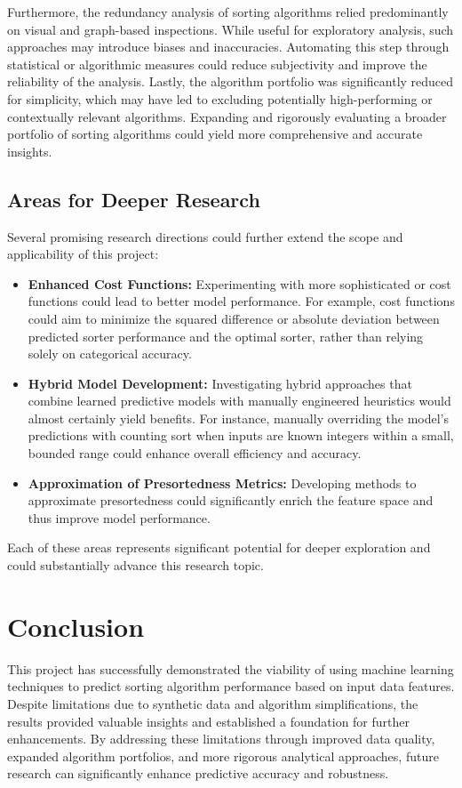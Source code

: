 \documentclass[twocolumn]{article}
\newcommand{\vsp}{\vspace{0.5em}}
\begin{document}
Furthermore, the redundancy analysis of sorting algorithms relied predominantly on visual and graph-based inspections. While useful for exploratory analysis, such approaches may introduce biases and inaccuracies. Automating this step through statistical or algorithmic measures could reduce subjectivity and improve the reliability of the analysis. Lastly, the algorithm portfolio was significantly reduced for simplicity, which may have led to excluding potentially high-performing or contextually relevant algorithms. Expanding and rigorously evaluating a broader portfolio of sorting algorithms could yield more comprehensive and accurate insights.

\subsection{Areas for Deeper Research}
Several promising research directions could further extend the scope and applicability of this project:

\begin{itemize}
    \item \textbf{Enhanced Cost Functions:} Experimenting with more sophisticated or cost functions could lead to better model performance. For example, cost functions could aim to minimize the squared difference or absolute deviation between predicted sorter performance and the optimal sorter, rather than relying solely on categorical accuracy. 

    \item \textbf{Hybrid Model Development:} Investigating hybrid approaches that combine learned predictive models with manually engineered heuristics would almost certainly yield benefits. For instance, manually overriding the model's predictions with counting sort when inputs are known integers within a small, bounded range could enhance overall efficiency and accuracy.

    \vsp 
    \vsp

    \item \textbf{Approximation of Presortedness Metrics:} Developing methods to approximate presortedness could significantly enrich the feature space and thus improve model performance.

\end{itemize}

Each of these areas represents significant potential for deeper exploration and could substantially advance this research topic.

\section{Conclusion}
This project has successfully demonstrated the viability of using machine learning techniques to predict sorting algorithm performance based on input data features. Despite limitations due to synthetic data and algorithm simplifications, the results provided valuable insights and established a foundation for further enhancements. By addressing these limitations through improved data quality, expanded algorithm portfolios, and more rigorous analytical approaches, future research can significantly enhance predictive accuracy and robustness. 
\end{document}
